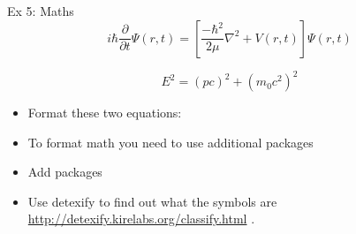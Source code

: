 \documentclass[10pt,times]{beamer}
\begin{document}
\begin{frame}{Ex 5: Maths}
\begin{equation*}
i \hbar \frac{\partial}{\partial t} \Psi(r,t) = 
\left[\frac{-\hbar^2}{2\mu}\nabla^2+V(r,t)\right]\Psi(r,t)
\end{equation*}

\begin{equation*}
E^2 = (pc)^2 + (m_0 c^2)^2
\end{equation*}


\begin{center}
\end{center}
\begin{itemize}
\item Format these two equations:
\item To format math you need to use additional packages 
\item Add packages
\item Use detexify to find out what the symbols are 
\href{http://detexify.kirelabs.org/classify.html}{http://detexify.kirelabs.org/classify.html}
.
\end{itemize}

\end{frame}
\end{document}
